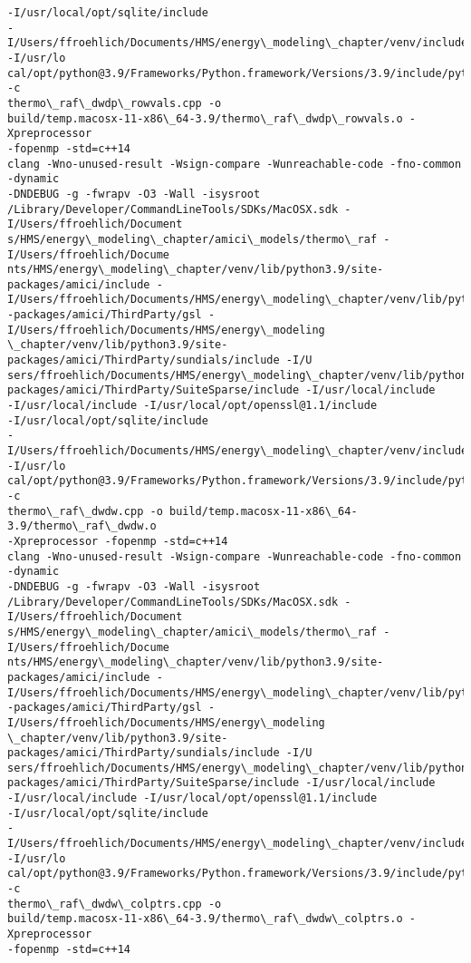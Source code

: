 \documentclass[11pt]{article}
\begin{document}
\begin{Verbatim}[commandchars=\\\{\}]
-I/usr/local/opt/sqlite/include
-I/Users/ffroehlich/Documents/HMS/energy\_modeling\_chapter/venv/include -I/usr/lo
cal/opt/python@3.9/Frameworks/Python.framework/Versions/3.9/include/python3.9 -c
thermo\_raf\_dwdp\_rowvals.cpp -o
build/temp.macosx-11-x86\_64-3.9/thermo\_raf\_dwdp\_rowvals.o -Xpreprocessor
-fopenmp -std=c++14
clang -Wno-unused-result -Wsign-compare -Wunreachable-code -fno-common -dynamic
-DNDEBUG -g -fwrapv -O3 -Wall -isysroot
/Library/Developer/CommandLineTools/SDKs/MacOSX.sdk -I/Users/ffroehlich/Document
s/HMS/energy\_modeling\_chapter/amici\_models/thermo\_raf -I/Users/ffroehlich/Docume
nts/HMS/energy\_modeling\_chapter/venv/lib/python3.9/site-packages/amici/include -
I/Users/ffroehlich/Documents/HMS/energy\_modeling\_chapter/venv/lib/python3.9/site
-packages/amici/ThirdParty/gsl -I/Users/ffroehlich/Documents/HMS/energy\_modeling
\_chapter/venv/lib/python3.9/site-packages/amici/ThirdParty/sundials/include -I/U
sers/ffroehlich/Documents/HMS/energy\_modeling\_chapter/venv/lib/python3.9/site-
packages/amici/ThirdParty/SuiteSparse/include -I/usr/local/include
-I/usr/local/include -I/usr/local/opt/openssl@1.1/include
-I/usr/local/opt/sqlite/include
-I/Users/ffroehlich/Documents/HMS/energy\_modeling\_chapter/venv/include -I/usr/lo
cal/opt/python@3.9/Frameworks/Python.framework/Versions/3.9/include/python3.9 -c
thermo\_raf\_dwdw.cpp -o build/temp.macosx-11-x86\_64-3.9/thermo\_raf\_dwdw.o
-Xpreprocessor -fopenmp -std=c++14
clang -Wno-unused-result -Wsign-compare -Wunreachable-code -fno-common -dynamic
-DNDEBUG -g -fwrapv -O3 -Wall -isysroot
/Library/Developer/CommandLineTools/SDKs/MacOSX.sdk -I/Users/ffroehlich/Document
s/HMS/energy\_modeling\_chapter/amici\_models/thermo\_raf -I/Users/ffroehlich/Docume
nts/HMS/energy\_modeling\_chapter/venv/lib/python3.9/site-packages/amici/include -
I/Users/ffroehlich/Documents/HMS/energy\_modeling\_chapter/venv/lib/python3.9/site
-packages/amici/ThirdParty/gsl -I/Users/ffroehlich/Documents/HMS/energy\_modeling
\_chapter/venv/lib/python3.9/site-packages/amici/ThirdParty/sundials/include -I/U
sers/ffroehlich/Documents/HMS/energy\_modeling\_chapter/venv/lib/python3.9/site-
packages/amici/ThirdParty/SuiteSparse/include -I/usr/local/include
-I/usr/local/include -I/usr/local/opt/openssl@1.1/include
-I/usr/local/opt/sqlite/include
-I/Users/ffroehlich/Documents/HMS/energy\_modeling\_chapter/venv/include -I/usr/lo
cal/opt/python@3.9/Frameworks/Python.framework/Versions/3.9/include/python3.9 -c
thermo\_raf\_dwdw\_colptrs.cpp -o
build/temp.macosx-11-x86\_64-3.9/thermo\_raf\_dwdw\_colptrs.o -Xpreprocessor
-fopenmp -std=c++14

\end{Verbatim}
\end{document}
